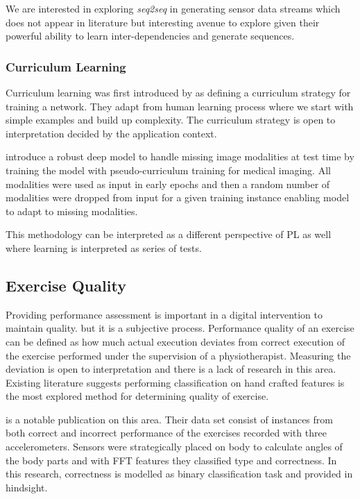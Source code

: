 We are interested in exploring \textit{seq2seq} in generating sensor data streams which does not appear in literature but interesting avenue to explore given their powerful ability to learn inter-dependencies and generate sequences. 

\subsubsection{Curriculum Learning}
Curriculum learning was first introduced by  as defining a curriculum strategy for training a network. They adapt from human learning process where we start with simple examples and build up complexity. The curriculum strategy is open to interpretation decided by the application context.

 introduce a robust deep model to handle missing image modalities at test time by training the model with pseudo-curriculum training for medical imaging. All modalities were used as input in early epochs and then a random number of modalities were dropped from input for a given training instance enabling model to adapt to missing modalities. 

This methodology can be interpreted as a different perspective of PL as well where learning is interpreted as series of tests. 

\subsection{Exercise Quality}
Providing performance assessment is important in a digital intervention to maintain quality. but it is a subjective process. Performance quality of an exercise can be defined as how much actual execution deviates from correct execution of the exercise performed under the supervision of a physiotherapist. Measuring the deviation is open to interpretation and there is a lack of research in this area. Existing literature suggests performing classification on hand crafted features is the most explored method for determining quality of exercise. 

 is a notable publication on this area. Their data set consist of instances from both correct and incorrect performance of the exercises recorded with three accelerometers. Sensors were strategically placed on body to calculate angles of the body parts and with FFT features they classified type and correctness. In this research, correctness is modelled as binary classification task and provided in hindsight. 

